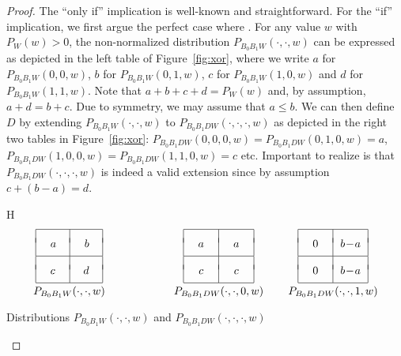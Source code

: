 \begin{proof}
The ``only if'' implication is well-known and straightforward. For the ``if'' implication, we first argue the perfect case where 
. For any value $w$ with $P_W(w)>0$, the non-normalized distribution $P_{B_0 B_1 W}(\cdot,\cdot,w)$ can be expressed as depicted in the left table of Figure~\ref{fig:xor}, where we write $a$ for $P_{B_0 B_1 W}(0,0,w)$, $b$ for $P_{B_0 B_1 W}(0,1,w)$, $c$ for $P_{B_0 B_1 W}(1,0,w)$ and $d$ for $P_{B_0 B_1 W}(1,1,w)$.
Note that $a + b + c + d = P_W(w)$ and, by assumption, $a+d = b+c$. 
Due to symmetry, we may assume that $a \leq b$. We can then define $D$ by
extending $P_{B_0 B_1 W}(\cdot,\cdot,w)$ to $P_{B_0
B_1 D W}(\cdot,\cdot,\cdot,w)$ as depicted in the right two tables in
Figure~\ref{fig:xor}: $P_{B_0 B_1 D W}(0,0,0,w) = P_{B_0 B_1 D
  W}(0,1,0,w) = a$, $P_{B_0 B_1 D W}(1,0,0,w) = P_{B_0 B_1 D
  W}(1,1,0,w) = c$ etc. Important to realize is that $P_{B_0 B_1 D W}(\cdot,\cdot,\cdot,w)$ is indeed a valid extension since by assumption $c + (b-a) = d$. 

\begin{myfigure}{H}
$$
{
\begin{array}{|c|c|}
\hline & \\[-1ex] \;\;\;a\,\;\; & \;\;\;b\,\;\; \\[1ex] \hline & \\[-1ex] c & d \\[1ex] \hline
\end{array}
\atop P_{B_0 B_1 W}(\cdot,\cdot,w) }
\qquad\qquad\qquad
{
\begin{array}{|c|c|}
\hline & \\[-1ex] \;\;\;a\;\;\; & \;\;\;a\;\;\; \\[1ex] \hline & \\[-1ex] c & c \\[1ex] \hline
\end{array}
\atop P_{B_0 B_1 D W}(\cdot,\cdot,0,w) }
\qquad
{
\begin{array}{|c|c|}
\hline & \\[-1ex] \;\;\;0\;\;\; & \,b\!-\!a\, \\[1ex] \hline & \\[-1ex] 0 & b\!-\!a \\[1ex] \hline
\end{array}
\atop P_{B_0 B_1 D W}(\cdot,\cdot,1,w) }
$$
\vspace{-3ex}
\caption{Distributions $P_{B_0 B_1 W}(\cdot,\cdot,w)$ and $P_{B_0 B_1 D W}(\cdot,\cdot,\cdot,w)$}\label{fig:xor}
\end{myfigure}


\end{proof}
